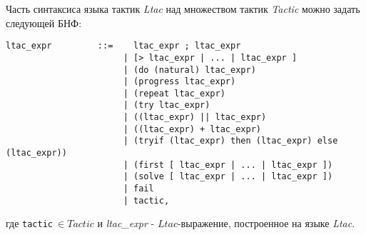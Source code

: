 \documentclass[12pt]{article}
\begin{document}
Часть синтаксиса  языка тактик \textit{Ltac} над множеством тактик \textit{Tactic} можно задать следующей БНФ:

\makeatletter
\def\verbatim@font{\linespread{1}\normalfont\ttfamily}
\makeatother
\begin{verbatim}
ltac_expr         ::=    ltac_expr ; ltac_expr
                       | [> ltac_expr | ... | ltac_expr ]
                       | (do (natural) ltac_expr)
                       | (progress ltac_expr)
                       | (repeat ltac_expr)
                       | (try ltac_expr)
                       | ((ltac_expr) || ltac_expr)
                       | ((ltac_expr) + ltac_expr)
                       | (tryif (ltac_expr) then (ltac_expr) else (ltac_expr))
                       | (first [ ltac_expr | ... | ltac_expr ])
                       | (solve [ ltac_expr | ... | ltac_expr ])
                       | fail
                       | tactic,
\end{verbatim}
где \verb|tactic|$\ \in Tactic$ и \textit{ltac\_expr} - $Ltac$-выражение, построенное на языке \textit{Ltac}. 




    


\end{document}
